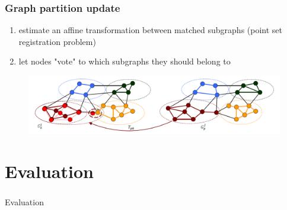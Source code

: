 \documentclass[hyperref={pdfpagelabels=false}]{beamer}
\begin{document}
\begin{frame}
\frametitle{Graph partition update}
\begin{enumerate}
\item estimate an affine transformation between matched subgraphs (point set registration problem)
\item let nodes "vote" to which subgraphs they should belong to
\end{enumerate}
\begin{figure} [h]
	\centering
	\includegraphics[scale=0.35]{fig/2levelGM/update.png}
\end{figure}
\end{frame}
\section{Evaluation} 
\begin{frame}
\frametitle{}
\centering 
{\Huge Evaluation}
\end{frame}
\end{document}
